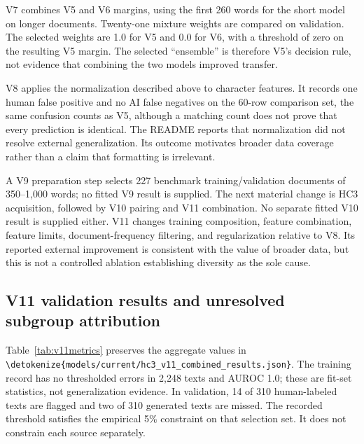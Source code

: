 \documentclass[11pt]{article}
\newcommand{\code}[1]{\expandafter\nolinkurl\expandafter{\detokenize{#1}}}
\begin{document}
V7 combines V5 and V6 margins, using the first 260 words for the short model
on longer documents. Twenty-one mixture weights are compared on validation.
The selected weights are 1.0 for V5 and 0.0 for V6, with a threshold of zero
on the resulting V5 margin. The selected ``ensemble'' is therefore V5's
decision rule, not evidence that combining the two models improved transfer.

V8 applies the normalization described above to character features. It
records one human false positive and no AI false negatives on the 60-row
comparison set, the same confusion counts as V5, although a matching count
does not prove that every prediction is identical. The README reports that
normalization did not resolve external generalization. Its outcome motivates
broader data coverage rather than a claim that formatting is irrelevant.

A V9 preparation step selects 227 benchmark training/validation documents
of 350--1,000 words; no fitted V9 result is supplied. The next material
change is HC3 acquisition, followed by V10 pairing and V11 combination.
No separate fitted V10 result is supplied either. V11 changes training
composition, feature combination, feature limits, document-frequency
filtering, and regularization relative to V8. Its reported external
improvement is consistent with the value of broader data, but this is not
a controlled ablation establishing diversity as the sole cause.

\subsection{V11 validation results and unresolved subgroup attribution}
Table~\ref{tab:v11metrics} preserves the aggregate values in
\code{models/current/hc3_v11_combined_results.json}. The training record
has no thresholded errors in 2,248 texts and AUROC 1.0; these are fit-set
statistics, not generalization evidence. In validation, 14 of 310
human-labeled texts are flagged and two of 310 generated texts are missed.
The recorded threshold satisfies the empirical 5\% constraint on that
selection set. It does not constrain each source separately.
\end{document}
